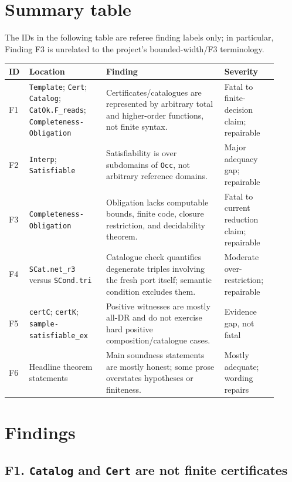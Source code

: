 \documentclass[11pt]{article}
\begin{document}
\section{Summary table}

The IDs in the following table are referee finding labels only; in particular,
Finding F3 is unrelated to the project's bounded-width/F3 terminology.

{\small
\begin{longtable}{L{0.055\linewidth}L{0.265\linewidth}L{0.405\linewidth}L{0.185\linewidth}}
\toprule
ID & Location & Finding & Severity \\
\midrule
F1 & \texttt{Template}; \texttt{Cert}; \texttt{Catalog}; \texttt{CatOk.F\_reads}; \texttt{Completeness-}\linebreak\texttt{Obligation} & Certificates/catalogues are represented by arbitrary total and higher-order functions, not finite syntax. & Fatal to finite-decision claim; repairable \\
F2 & \texttt{Interp}; \texttt{Satisfiable} & Satisfiability is over subdomains of \texttt{Occ}, not arbitrary reference domains. & Major adequacy gap; repairable \\
F3 & \texttt{Completeness-}\linebreak\texttt{Obligation} & Obligation lacks computable bounds, finite code, closure restriction, and decidability theorem. & Fatal to current reduction claim; repairable \\
F4 & \texttt{SCat.net\_r3} versus \texttt{SCond.tri} & Catalogue check quantifies degenerate triples involving the fresh port itself; semantic condition excludes them. & Moderate over-restriction; repairable \\
F5 & \texttt{certC}; \texttt{certK}; \texttt{sample-}\linebreak\texttt{satisfiable\_ex} & Positive witnesses are mostly all-DR and do not exercise hard positive composition/catalogue cases. & Evidence gap, not fatal \\
F6 & Headline theorem statements & Main soundness statements are mostly honest; some prose overstates hypotheses or finiteness. & Mostly adequate; wording repairs \\
\bottomrule
\end{longtable}
}

\section{Findings}

\subsection{F1. \texttt{Catalog} and \texttt{Cert} are not finite certificates}
\end{document}

